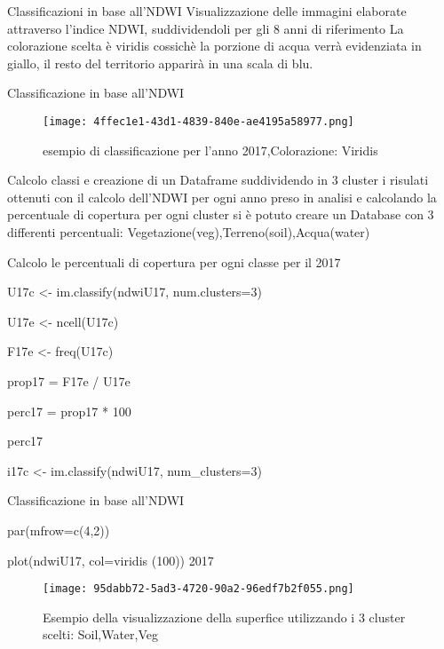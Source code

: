 \documentclass{beamer} %
\begin{document}
 
 \begin{frame}{Classificazioni in base all'NDWI} 
        Visualizzazione delle immagini elaborate attraverso l'indice NDWI, 
suddividendoli per gli 8 anni di riferimento
La colorazione scelta è viridis cossichè la porzione di acqua verrà evidenziata in giallo, 
il resto del territorio apparirà in una scala di blu. 

        

       \end{frame}
       \begin{frame}{Classificazione in base all'NDWI}
           \begin{figure}
               \centering
               \texttt{[image: 4ffec1e1-43d1-4839-840e-ae4195a58977.png]}
               \caption{ esempio di classificazione per l'anno 2017,Colorazione: Viridis}
               \label{fig:enter-label}
           \end{figure}
       \end{frame}
       \begin{frame}{Calcolo classi e creazione di un Dataframe}
           suddividendo in 3 cluster i risulati ottenuti con il calcolo dell'NDWI per ogni anno preso in analisi e calcolando la percentuale di copertura per ogni cluster si è potuto creare un Database con 3 differenti percentuali: Vegetazione(veg),Terreno(soil),Acqua(water)


           Calcolo le percentuali di copertura per ogni classe per il 2017

           U17c <- im.classify(ndwiU17, num.clusters=3)
           
           U17e <- ncell(U17c)
           
           F17e <- freq(U17c)
           
           prop17 = F17e / U17e
           
           perc17 = prop17 * 100
           
           perc17
           
           i17c <- im.classify(ndwiU17, num_clusters=3)
           
       \end{frame}
       
       \begin{frame}{Classificazione in base all'NDWI}

par(mfrow=c(4,2))

plot(ndwiU17, col=viridis (100))  2017 
         
           \begin{figure}
               \centering
               \texttt{[image: 95dabb72-5ad3-4720-90a2-96edf7b2f055.png]}
               \caption{Esempio della visualizzazione della superfice utilizzando i 3 cluster scelti: Soil,Water,Veg}
               \label{fig:enter-label}
           \end{figure}
       \end{frame}
\end{document}
